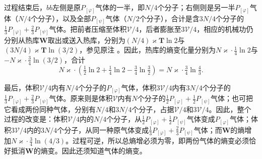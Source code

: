 \documentclass[fontsize=13pt,twoside,openany,headings=normal,parskip=false,bookmarkpackage=false,DIV=calc]{scrbook}
\begin{document}
过程结束后，$bb$左侧是原$P_{[\varphi]}$气体的一半，即$N/4$个分子；右侧则是\hypertarget{origpage-199}{}\label{origpage-199}另一半$P_{[\varphi]}$气体（$N/4$个分子），以及全部$P_{[\psi]}$气体（$N/2$个分子），合计是含$3N/4$个分子的$\tfrac13P_{[\varphi]}+\tfrac23P_{[\psi]}$气体。把前者压缩至体积$\mathcal V/4$，后者膨胀至$3\mathcal V/4$，相应的机械功仍分别从热库$\boldsymbol{W}$取出或送入热库，分别为$(N/4)\varkappa\mathbf T\ln2$与$(3N/4)\varkappa\mathbf T\ln(3/2)$，参见原注 \hyperlink{note-191}{}。因此，热库的熵变化量分别为$N\varkappa\cdot\tfrac14\ln2$与$-N\varkappa\cdot\tfrac34\ln(3/2)$，合计
\[
N\varkappa\cdot\left(\tfrac12\ln2+\tfrac14\ln2-\tfrac34\ln\tfrac32\right)
=N\varkappa\cdot\tfrac34\ln\tfrac43.
\]

最后，体积$\mathcal V/4$内有$N/4$个分子的$P_{[\varphi]}$气体，体积$3\mathcal V/4$内有$3N/4$个分子的$\tfrac13P_{[\varphi]}+\tfrac23P_{[\psi]}$气体。原来则是体积$\mathcal V$内有$N$个分子的$\tfrac12P_{[\varphi]}+\tfrac12P_{[\psi]}$气体；也可把它看成两份同种气体，分别有$N/4$和$3N/4$个分子，占据$\mathcal V/4$和$3\mathcal V/4$。因此，整个过程的改变是：体积$\mathcal V/4$内的$N/4$个分子，从$\tfrac12P_{[\varphi]}+\tfrac12P_{[\psi]}$气体变成$P_{[\varphi]}$气体；体积$3\mathcal V/4$内的$3N/4$个分子，从同一种原气体变成$\tfrac13P_{[\varphi]}+\tfrac23P_{[\psi]}$气体；而$\boldsymbol{W}$的熵增加$N\varkappa\cdot\tfrac34\ln(4/3)$。过程可逆，所以总熵增必须为零，即两份气体的熵变必须恰好抵消$\boldsymbol{W}$的熵变。因此还须知道气体的熵变。
\end{document}

